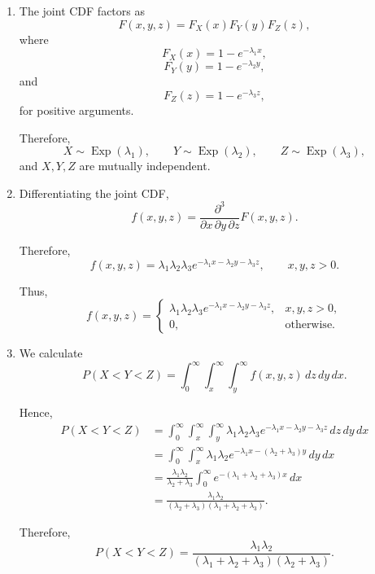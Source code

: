 \documentclass[11pt]{article}
\newenvironment{solution}{
    \par
    \begin{tcolorbox}[
        colback=white,
        colframe=uwgold,
        boxrule=0.7pt,
        arc=2mm,
        left=3mm,
        right=3mm,
        top=2mm,
        bottom=2mm,
        breakable,
        before skip=0.5em,
        after skip=1em,
        title=\textbf{Solution},
        coltitle=uwpurple,
        fonttitle=\bfseries
    ]
}{
    \end{tcolorbox}
}
\begin{document}
\begin{solution}

\begin{enumerate}[label=(\alph*)]

\item The joint CDF factors as
\[
F(x,y,z)
=
F_X(x)F_Y(y)F_Z(z),
\]
where
\[
F_X(x)=1-e^{-\lambda_1x},
\]
\[
F_Y(y)=1-e^{-\lambda_2y},
\]
and
\[
F_Z(z)=1-e^{-\lambda_3z},
\]
for positive arguments.

Therefore,
\[
X\sim\operatorname{Exp}(\lambda_1),
\qquad
Y\sim\operatorname{Exp}(\lambda_2),
\qquad
Z\sim\operatorname{Exp}(\lambda_3),
\]
and \(X,Y,Z\) are mutually independent.

\item Differentiating the joint CDF,
\[
f(x,y,z)
=
\frac{\partial^3}
{\partial x\,\partial y\,\partial z}
F(x,y,z).
\]

Therefore,
\[
f(x,y,z)
=
\lambda_1\lambda_2\lambda_3
e^{-\lambda_1x-\lambda_2y-\lambda_3z},
\qquad
x,y,z>0.
\]

Thus,
\[
f(x,y,z)
=
\begin{cases}
\lambda_1\lambda_2\lambda_3
e^{-\lambda_1x-\lambda_2y-\lambda_3z},
&
x,y,z>0,\\
0,
&
\text{otherwise}.
\end{cases}
\]

\item We calculate
\[
P(X<Y<Z)
=
\int_0^\infty
\int_x^\infty
\int_y^\infty
f(x,y,z)\,dz\,dy\,dx.
\]

Hence,
\[
\begin{aligned}
P(X<Y<Z)
&=
\int_0^\infty
\int_x^\infty
\int_y^\infty
\lambda_1\lambda_2\lambda_3
e^{-\lambda_1x-\lambda_2y-\lambda_3z}
\,dz\,dy\,dx\\
&=
\int_0^\infty
\int_x^\infty
\lambda_1\lambda_2
e^{-\lambda_1x-(\lambda_2+\lambda_3)y}
\,dy\,dx\\
&=
\frac{\lambda_1\lambda_2}
{\lambda_2+\lambda_3}
\int_0^\infty
e^{-(\lambda_1+\lambda_2+\lambda_3)x}
\,dx\\
&=
\frac{\lambda_1\lambda_2}
{(\lambda_2+\lambda_3)
(\lambda_1+\lambda_2+\lambda_3)}.
\end{aligned}
\]

Therefore,
\[
P(X<Y<Z)
=
\frac{\lambda_1\lambda_2}
{(\lambda_1+\lambda_2+\lambda_3)(\lambda_2+\lambda_3)}.
\]

\end{enumerate}

\end{solution}
\end{document}
